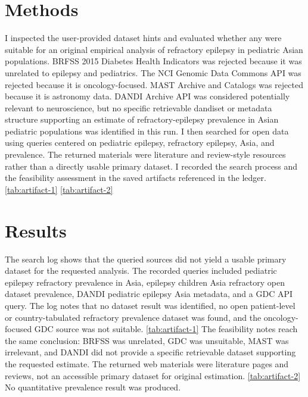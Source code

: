 \documentclass[11pt]{article}
\begin{document}
\section{Methods}
I inspected the user-provided dataset hints and evaluated whether any were suitable for an original empirical analysis of refractory epilepsy in pediatric Asian populations. BRFSS 2015 Diabetes Health Indicators was rejected because it was unrelated to epilepsy and pediatrics. The NCI Genomic Data Commons API was rejected because it is oncology-focused. MAST Archive and Catalogs was rejected because it is astronomy data. DANDI Archive API was considered potentially relevant to neuroscience, but no specific retrievable dandiset or metadata structure supporting an estimate of refractory-epilepsy prevalence in Asian pediatric populations was identified in this run. I then searched for open data using queries centered on pediatric epilepsy, refractory epilepsy, Asia, and prevalence. The returned materials were literature and review-style resources rather than a directly usable primary dataset. I recorded the search process and the feasibility assessment in the saved artifacts referenced in the ledger. \ref{tab:artifact-1} \ref{tab:artifact-2}

\section{Results}
The search log shows that the queried sources did not yield a usable primary dataset for the requested analysis. The recorded queries included pediatric epilepsy refractory prevalence in Asia, epilepsy children Asia refractory open dataset prevalence, DANDI pediatric epilepsy Asia metadata, and a GDC API query. The log notes that no dataset result was identified, no open patient-level or country-tabulated refractory prevalence dataset was found, and the oncology-focused GDC source was not suitable. \ref{tab:artifact-1} The feasibility notes reach the same conclusion: BRFSS was unrelated, GDC was unsuitable, MAST was irrelevant, and DANDI did not provide a specific retrievable dataset supporting the requested estimate. The returned web materials were literature pages and reviews, not an accessible primary dataset for original estimation. \ref{tab:artifact-2} No quantitative prevalence result was produced.
\end{document}
